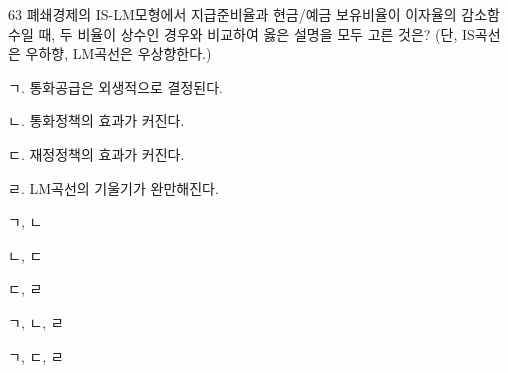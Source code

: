 \begin{question}{63}
폐쇄경제의 IS-LM모형에서 지급준비율과 현금/예금 보유비율이 이자율의 감소함수일 때, 두 비율이 상수인 경우와 비교하여 옳은 설명을 모두 고른 것은? (단, IS곡선은 우하향, LM곡선은 우상향한다.)
\begin{framedtext}
ㄱ. 통화공급은 외생적으로 결정된다. \par
ㄴ. 통화정책의 효과가 커진다. \par
ㄷ. 재정정책의 효과가 커진다. \par
ㄹ. LM곡선의 기울기가 완만해진다.
\end{framedtext}
\begin{choices}
  \item ㄱ, ㄴ
  \item ㄴ, ㄷ
  \item ㄷ, ㄹ
  \item ㄱ, ㄴ, ㄹ
  \item ㄱ, ㄷ, ㄹ
\end{choices}
\end{question}

